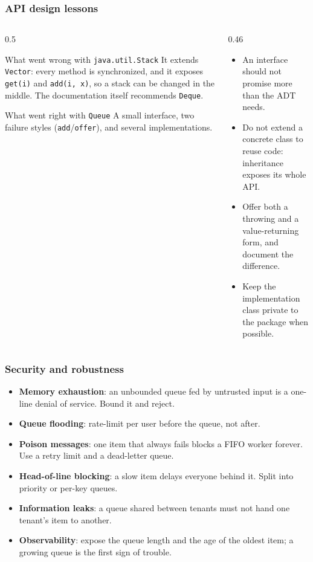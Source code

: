 \documentclass[aspectratio=169,10pt,compress]{beamer}
\begin{document}
\begin{frame}[t,fragile] \frametitle{API design lessons}
  \begin{columns}[T]
    \begin{column}{0.5\textwidth}
      \begin{block}{What went wrong with \texttt{java.util.Stack}}
        \small It extends \texttt{Vector}: every method is synchronized, and it exposes \texttt{get(i)} and \texttt{add(i, x)}, so a stack can be changed in the middle. The documentation itself recommends \texttt{Deque}.
      \end{block}
      \begin{block}{What went right with \texttt{Queue}}
        \small A small interface, two failure styles (\texttt{add}/\texttt{offer}), and several implementations.
      \end{block}
    \end{column}
    \begin{column}{0.46\textwidth}
      \begin{itemize}\small
        \item An interface should not promise more than the ADT needs.
        \item Do not extend a concrete class to reuse code: inheritance exposes its whole API.
        \item Offer both a throwing and a value-returning form, and document the difference.
        \item Keep the implementation class private to the package when possible.
      \end{itemize}
    \end{column}
  \end{columns}
\end{frame}




\begin{frame}[t,fragile] \frametitle{Security and robustness}
  \begin{itemize}
    \item \textbf{Memory exhaustion}: an unbounded queue fed by untrusted input is a one-line denial of service. Bound it and reject.
    \item \textbf{Queue flooding}: rate-limit per user before the queue, not after.
    \item \textbf{Poison messages}: one item that always fails blocks a FIFO worker forever. Use a retry limit and a dead-letter queue.
    \item \textbf{Head-of-line blocking}: a slow item delays everyone behind it. Split into priority or per-key queues.
    \item \textbf{Information leaks}: a queue shared between tenants must not hand one tenant's item to another.
    \item \textbf{Observability}: expose the queue length and the age of the oldest item; a growing queue is the first sign of trouble.
  \end{itemize}
\end{frame}
\end{document}
